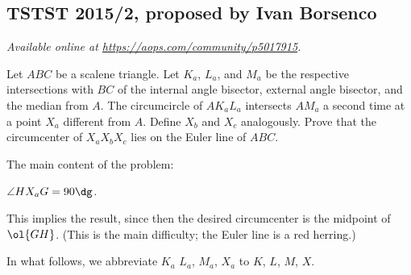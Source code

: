 \documentclass[11pt]{scrartcl}
\begin{document}
\subsection{TSTST 2015/2, proposed by Ivan Borsenco}
\textsl{Available online at \url{https://aops.com/community/p5017915}.}
\begin{mdframed}[style=mdpurplebox,frametitle={Problem statement}]
Let $ABC$ be a scalene triangle. Let $K_a$, $L_a$, and
$M_a$ be the respective intersections with $BC$ of the internal
angle bisector, external angle bisector, and the median from
$A$. The circumcircle of $AK_aL_a$ intersects $AM_a$ a second time
at a point $X_a$ different from $A$. Define $X_b$ and $X_c$
analogously. Prove that the circumcenter of $X_aX_bX_c$ lies on
the Euler line of $ABC$.
\end{mdframed}
The main content of the problem:
\begin{claim*}
  $\angle H X_a G = 90\dg$.
\end{claim*}
This implies the result,
since then the desired circumcenter is the midpoint of $\ol{GH}$.
(This is the main difficulty; the Euler line is a red herring.)

In what follows, we abbreviate $K_a$ $L_a$, $M_a$, $X_a$
to $K$, $L$, $M$, $X$.
\end{document}
